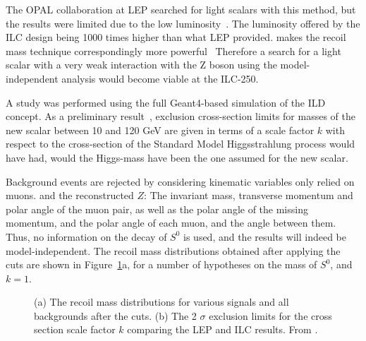 The OPAL collaboration at LEP searched
for light scalars with this method,
but the  results were limited due to the low luminosity~\cite{Abbiendi:2002in}.
The luminosity offered by the ILC design being 1000
times higher than what LEP provided.
makes the recoil mass technique correspondingly more powerful~\cite{Asner:2013psa}
Therefore a search for a light scalar with a very weak interaction with
the Z boson using the model-independent analysis would become  viable
at the ILC-250.

A study was performed using the full Geant4-based simulation of the
ILD concept.
As a preliminary result~\cite{yanichep},
exclusion cross-section limits for
masses of the new scalar between 10 and 120
GeV are given in terms of a scale factor $k$ with respect to the
cross-section of the Standard Model Higgsstrahlung process would
have had, would the Higgs-mass have been the one assumed for the new scalar.

Background events are rejected by considering kinematic variables
only relied on muons. and the reconstructed $Z$:
The invariant mass, transverse momentum and polar angle of the muon pair,
as well as the polar angle of the missing momentum,
and the polar angle of each muon, and the angle between them.
Thus, no information on the decay of $S^0$ is used,
and the results will indeed be model-independent.
The recoil mass distributions obtained after applying the cuts
are shown in Figure~\ref{fig:searches_newscalars}a, 
for a number of hypotheses
on the mass of $S^0$, and $k=1$.
\begin{figure}[]
\setlength{\unitlength}{1.0cm}
\hspace{0.05\linewidth}
\caption{\label{fig:searches_newscalars} (a) The recoil mass distributions for various signals
and all backgrounds after the cuts.
(b) The 2 $\sigma$ exclusion limits for the cross section scale factor $k$ comparing the LEP and
ILC results. From \cite{yanichep}.}
\end{figure}

